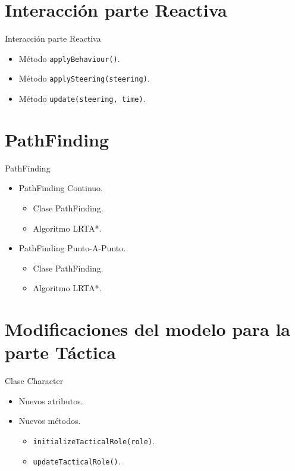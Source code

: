 \documentclass[10pt]{beamer}
\begin{document}
\section{Interacción parte Reactiva}
\begin{frame}{Interacción parte Reactiva}
\begin{itemize}[<+- | alert@+>]
	\item Método \texttt{applyBehaviour()}.
	\item Método \texttt{applySteering(steering)}.
	\item Método \texttt{update(steering, time)}.
\end{itemize}
\end{frame}

\section{PathFinding}
\begin{frame}{PathFinding}
\begin{itemize}[<+- | alert@+>]
	\item PathFinding Continuo.
	\begin{itemize}[<+- | alert@+>]
  		\item Clase PathFinding.
  		\item Algoritmo LRTA*.
 	\end{itemize}
	\item PathFinding Punto-A-Punto.
	\begin{itemize}[<+- | alert@+>]
  		\item Clase PathFinding.
  		\item Algoritmo LRTA*.
 	\end{itemize}
\end{itemize}
\end{frame}


\section{Modificaciones del modelo para la parte Táctica}
\begin{frame}{Clase Character}
\begin{itemize}[<+- | alert@+>]
	\item Nuevos atributos.
	\item Nuevos métodos.
	\begin{itemize}[<+- | alert@+>]
  		\item \texttt{initializeTacticalRole(role)}.
  		\item \texttt{updateTacticalRole()}.
 	\end{itemize}
\end{itemize}
\end{frame}
\end{document}
